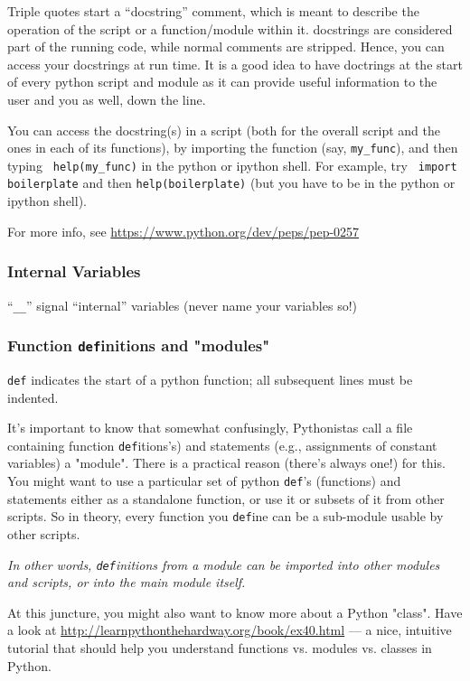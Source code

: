 Triple quotes start a ``docstring'' comment, which is meant to describe 
the operation of the script or a function/module within it. docstrings 
are considered part of the running code, while normal comments are 
stripped. Hence, you can access your docstrings at run time. It is a 
good idea to have doctrings at the start of every python script and 
module as it can provide useful information to the user and you as 
well, down the line. 

You can access the docstring(s) in a script (both 
for the overall script and the ones in each of its functions), by 
importing the function (say, {\tt my\_func}), and then typing {\tt 
help(my\_func)} in the python or ipython shell. For example, try {\tt 
import boilerplate} and then {\tt help(boilerplate)} (but you have 
to be in the python or ipython shell). 

For more info, see \url{https://www.python.org/dev/peps/pep-0257}

\subsubsection{Internal Variables}

``{\tt \_\_}'' signal ``internal'' variables (never name your
variables so!)

\subsubsection{Function {\tt def}initions and "modules"}

{\tt def} indicates the start of a python function; all subsequent 
lines must be indented.

It's important to know that somewhat confusingly, Pythonistas 
call a file containing function {\tt def}itions's) and statements 
(e.g., assignments of constant variables) a "module". There is a 
practical reason (there's always one!) for this. You might want to use 
a particular set of python {\tt def}'s (functions) and statements 
either as a standalone function, or use it or subsets of it from other 
scripts. So in theory, every function you {\tt def}ine can be a 
sub-module usable by other scripts. 

{\it In other words, {\tt def}initions from a module can be imported 
into other modules and scripts, or into the main module itself.} 

At this juncture, you might also want to know more about a Python 
"class". Have a look at 
\url{http://learnpythonthehardway.org/book/ex40.html} --- a nice, 
intuitive tutorial that should help you understand functions vs. 
modules vs. classes in Python.

